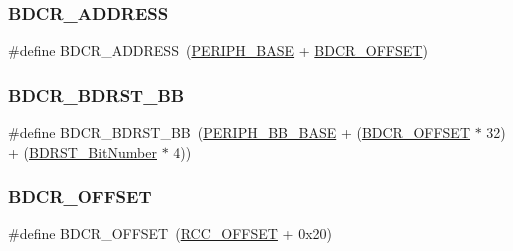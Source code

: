 \subsubsection{\texorpdfstring{BDCR\_ADDRESS}{BDCR\_ADDRESS}}
{\footnotesize\ttfamily \#define B\+D\+C\+R\+\_\+\+A\+D\+D\+R\+E\+SS~(\mbox{\hyperlink{group___peripheral__memory__map_ga9171f49478fa86d932f89e78e73b88b0}{P\+E\+R\+I\+P\+H\+\_\+\+B\+A\+SE}} + \mbox{\hyperlink{group___r_c_c___private___defines_ga5f8a0c3cb5f5c835bf7eef09515138ad}{B\+D\+C\+R\+\_\+\+O\+F\+F\+S\+ET}})}

\mbox{\label{group___r_c_c___private___defines_ga892fdf297b85b85cbaf0723649b31818}} 
\subsubsection{\texorpdfstring{BDCR\_BDRST\_BB}{BDCR\_BDRST\_BB}}
{\footnotesize\ttfamily \#define B\+D\+C\+R\+\_\+\+B\+D\+R\+S\+T\+\_\+\+BB~(\mbox{\hyperlink{group___peripheral__memory__map_gaed7efc100877000845c236ccdc9e144a}{P\+E\+R\+I\+P\+H\+\_\+\+B\+B\+\_\+\+B\+A\+SE}} + (\mbox{\hyperlink{group___r_c_c___private___defines_ga5f8a0c3cb5f5c835bf7eef09515138ad}{B\+D\+C\+R\+\_\+\+O\+F\+F\+S\+ET}} $\ast$ 32) + (\mbox{\hyperlink{group___r_c_c___private___defines_gae6718158034388d8fde8caaa28ffe8b9}{B\+D\+R\+S\+T\+\_\+\+Bit\+Number}} $\ast$ 4))}

\mbox{\label{group___r_c_c___private___defines_ga5f8a0c3cb5f5c835bf7eef09515138ad}} 
\subsubsection{\texorpdfstring{BDCR\_OFFSET}{BDCR\_OFFSET}}
{\footnotesize\ttfamily \#define B\+D\+C\+R\+\_\+\+O\+F\+F\+S\+ET~(\mbox{\hyperlink{group___r_c_c___private___defines_ga539e07c3b3c55f1f1d47231341fb11e1}{R\+C\+C\+\_\+\+O\+F\+F\+S\+ET}} + 0x20)}

\mbox{\label{group___r_c_c___private___defines_gaf70aaf70b0752ccb3a60307b2fb46038}} 
